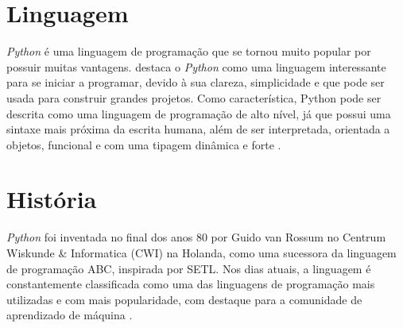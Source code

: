 
\section{Linguagem}
\indent \textit{Python} é uma linguagem de programação que se tornou muito popular por possuir muitas vantagens. \cite{menezes2010introduccao} destaca o \textit{Python} como uma linguagem interessante para se iniciar a programar, devido à sua clareza, simplicidade e que pode ser usada para construir grandes projetos. Como característica, Python pode ser descrita como uma linguagem de programação de alto nível, já que possui uma sintaxe mais próxima da escrita humana, além de ser interpretada, orientada a objetos, funcional e com uma tipagem dinâmica e forte \cite{wiki:python}.

\section{História}
\indent \textit{Python} foi inventada no final dos anos 80 por Guido van Rossum no Centrum Wiskunde \& Informatica (CWI) na Holanda, como uma sucessora da linguagem de programação ABC, inspirada por SETL. Nos dias atuais, a linguagem é constantemente classificada como uma das linguagens de programação mais utilizadas e com mais popularidade, com destaque para a comunidade de aprendizado de máquina \cite{wiki:python}.